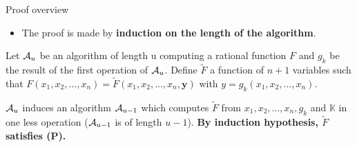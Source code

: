 \begin{frame}{Proof overview}

    \begin{itemize}
        \item The proof is made by \textbf{induction on the length of the algorithm}.
    \end{itemize}

    \vskip 0.5cm
    Let \alert{$\mathcal{A}_u$} be an algorithm of length u computing a rational function $F$ and $g_k$ be the result of the \alert{first operation} of $\mathcal{A}_u$.
    \vskip 0.3cm
    Define \alert{$\widetilde{F}$} a function of $n+1$ variables such that $F(x_1,x_2,...,x_n)=\widetilde{F}(x_1,x_2,...,x_n,\mathbf{y})$ with $y = g_k(x_1,x_2,...,x_n)$.
    \vskip 0.3cm
    
    $\mathcal{A}_u$ induces an algorithm \alert{$\mathcal{A}_{u-1}$} which computes $\widetilde{F}$ from $x_1,x_2,...,x_n,g_k$ and $\mathbb{K}$ in one less operation ($\mathcal{A}_{u-1}$ is of length $u-1$). \textbf{By induction hypothesis, $\widetilde{F}$ satisfies (P).}

\end{frame}


